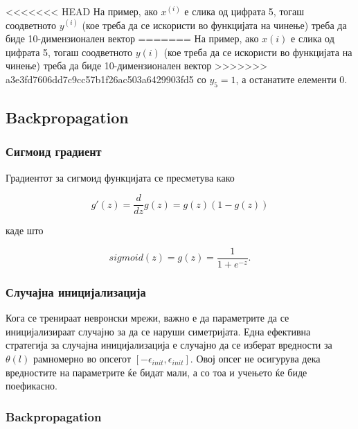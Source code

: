 <<<<<<< HEAD
На пример, ако $x^{(i)}$ е слика од цифрата 5, тогаш соодветното $y^{(i)}$ (кое
треба да се искористи во функцијата на чинење) треба да биде 10-димензионален вектор
=======
На пример, ако $x(i)$ е слика од цифрата 5, тогаш соодветното $y(i)$ (кое треба
да се искористи во функцијата на чинење) треба да биде 10-димензионален вектор
>>>>>>> a3e3fd7606dd7c9cc57b1f26ac503a6429903fd5
со $y_5 = 1$, а останатите елементи 0.



\subsection{Backpropagation}

\subsubsection{Сигмоид градиент}

Градиентот за сигмоид функцијата се пресметува како

\[
	g'(z) = \frac{d}{dz}g(z) = g(z)(1 - g(z))
\]

каде што

\[
	sigmoid(z) = g(z) = \frac{1}{1 + e^{-z}}.
\]

\subsubsection{Случајна иницијализација}

Кога се тренираат невронски мрежи, важно е да параметрите да се иницијализираат
случајно за да се наруши симетријата. Една ефективна стратегија за случајна
иницијализација е случајно да се изберат вредности за $\theta(l)$ рамномерно во
опсегот $[-\epsilon_{init}, \epsilon_{init}]$. Овој опсег не осигурува дека
вредностите на параметрите ќе бидат мали, а со тоа и учењето ќе биде поефикасно.



\subsubsection{Backpropagation}

